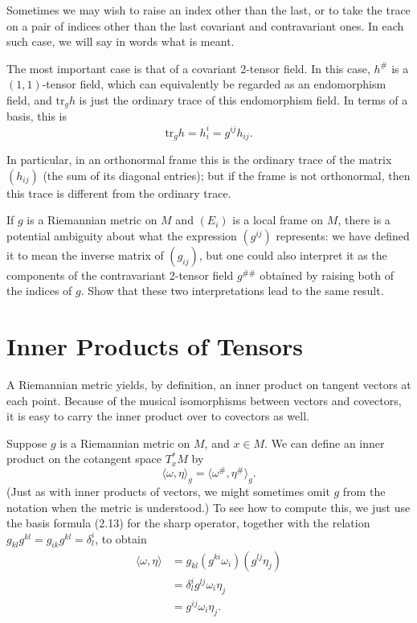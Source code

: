 Sometimes we may wish to raise an index other than the last, or to take the trace on a pair of indices other than the last covariant and contravariant ones. In each such case, we will say in words what is meant.

The most important case is that of a covariant 2-tensor field. In this case, $h^\#$ is a $(1,1)$-tensor field, which can equivalently be regarded as an endomorphism field, and $\text{tr}_g h$ is just the ordinary trace of this endomorphism field. In terms of a basis, this is
\[
\text{tr}_g h = h_i^i = g^{ij} h_{ij}.
\]

In particular, in an orthonormal frame this is the ordinary trace of the matrix $(h_{ij})$ (the sum of its diagonal entries); but if the frame is not orthonormal, then this trace is different from the ordinary trace.

\begin{exercise}
\label{exer:inverse-metric-ambiguity}
If $g$ is a Riemannian metric on $M$ and $(E_i)$ is a local frame on $M$, there is a potential ambiguity about what the expression $(g^{ij})$ represents: we have defined it to mean the inverse matrix of $(g_{ij})$, but one could also interpret it as the components of the contravariant 2-tensor field $g^{\#\#}$ obtained by raising both of the indices of $g$. Show that these two interpretations lead to the same result.
\end{exercise}

\section{Inner Products of Tensors}

A Riemannian metric yields, by definition, an inner product on tangent vectors at each point. Because of the musical isomorphisms between vectors and covectors, it is easy to carry the inner product over to covectors as well.

Suppose $g$ is a Riemannian metric on $M$, and $x \in M$. We can define an inner product on the cotangent space $T_x^* M$ by
\[
\langle \omega, \eta \rangle_g = \langle \omega^\#, \eta^\# \rangle_g.
\]
(Just as with inner products of vectors, we might sometimes omit $g$ from the notation when the metric is understood.) To see how to compute this, we just use the basis formula (2.13) for the sharp operator, together with the relation $g_{kl}g^{kl} = g_{ik}g^{kl} = \delta_l^i$, to obtain
\begin{align*}
\langle\omega, \eta\rangle &= g_{kl}(g^{ki}\omega_i)(g^{lj}\eta_j)\\
&= \delta_l^i g^{lj}\omega_i\eta_j\\
&= g^{ij}\omega_i\eta_j.
\end{align*}

